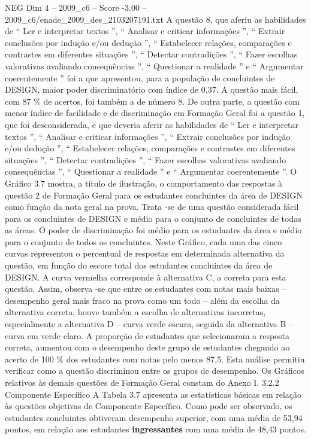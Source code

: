 \begin{textsample}{NEG Dim 4 – 2009\_c6 – Score -3.00 – 2009\_c6/enade\_2009\_des\_2103207191.txt}
A questão 8, que aferiu as habilidades de “ Ler e interpretar textos ”, “ Analisar e criticar informações ”, “ Extrair conclusões por indução e/ou dedução ”, “ Estabelecer relações, comparações e contrastes em diferentes situações ”, “ Detectar contradições ”, “ Fazer escolhas valorativas avaliando consequências ”, “ Questionar a realidade ” e “ Argumentar coerentemente ” foi a que apresentou, para a população de concluintes de DESIGN, maior poder discriminatório com índice de 0,37.
A questão mais fácil, com 87 \% de acertos, foi também a de número 8.
De outra parte, a questão com menor índice de facilidade e de discriminação em Formação Geral foi a questão 1, que foi desconsiderada, e que deveria aferir as habilidades de “ Ler e interpretar textos ”, “ Analisar e criticar informações ”, “ Extrair conclusões por indução e/ou dedução ”, “ Estabelecer relações, comparações e contrastes em diferentes situações ”, “ Detectar contradições ”, “ Fazer escolhas valorativas avaliando consequências ”, “ Questionar a realidade ” e “ Argumentar coerentemente ”.
O Gráfico 3.7 mostra, a título de ilustração, o comportamento das respostas à questão 2 de Formação Geral para os estudantes concluintes da área de DESIGN como função da nota geral na prova.
Trata -se de uma questão considerada fácil para os concluintes de DESIGN e médio para o conjunto de concluintes de todas as áreas.
O poder de discriminação foi médio para os estudantes da área e médio para o conjunto de todos os concluintes.
Neste Gráfico, cada uma das cinco curvas representou o percentual de respostas em determinada alternativa da questão, em função do escore total dos estudantes concluintes da área de DESIGN.
A curva vermelha corresponde à alternativa C, a correta para esta questão.
Assim, observa -se que entre os estudantes com notas mais baixas – desempenho geral mais fraco na prova como um todo – além da escolha da alternativa correta, houve também a escolha de alternativas incorretas, especialmente a alternativa D – curva verde escura, seguida da alternativa B – curva em verde claro.
A proporção de estudantes que selecionaram a resposta correta, aumentou com o desempenho deste grupo de estudantes chegando ao acerto de 100 \% dos estudantes com notas pelo menos 87,5.
Esta análise permitiu verificar como a questão discriminou entre os grupos de desempenho.
Os Gráficos relativos às demais questões de Formação Geral constam do Anexo I. 3.2.2 Componente Específico A Tabela 3.7 apresenta as estatísticas básicas em relação às questões objetivas de Componente Específico.
Como pode ser observado, os estudantes concluintes obtiveram desempenho superior, com uma média de 53,94 pontos, em relação aos estudantes \textbf{ingressantes} com uma média de 48,43 pontos.

\end{textsample}
